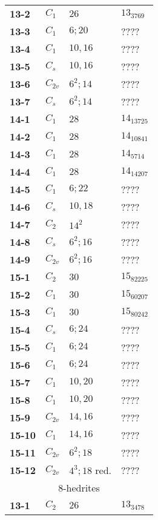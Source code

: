 \documentclass[12pt]{article}
\begin{document}
\begin{table}
\begin{center}
{\begin{minipage}{7cm}
\begin{tabular}{||l|l|l|l||}
{\bf 13-2}      &$C_1$  &$26$           &$13_{3769}$\\
{\bf 13-3}      &$C_1$  &$6; 20$                &????\\
{\bf 13-4}      &$C_1$  &$10, 16$               &????\\
{\bf 13-5}      &$C_s$  &$10, 16$               &????\\
{\bf 13-6}      &$C_{2v}$       &$6^2; 14$      &????\\
{\bf 13-7}      &$C_{s}$        &$6^2; 14$      &????\\\hline
{\bf 14-1}      &$C_1$  &$28$           &$14_{13725}$\\
{\bf 14-2}      &$C_1$  &$28$           &$14_{10841}$\\
{\bf 14-3}      &$C_1$  &$28$           &$14_{5714}$\\
{\bf 14-4}      &$C_1$  &$28$           &$14_{14207}$\\
{\bf 14-5}      &$C_1$  &$6; 22$                &????\\
{\bf 14-6}      &$C_s$  &$10, 18$               &????\\
{\bf 14-7}      &$C_2$  &$14^2$         &????\\
{\bf 14-8}      &$C_s$  &$6^2; 16$      &????\\
{\bf 14-9}      &$C_{2v}$       &$6^2; 16$      &????\\\hline
{\bf 15-1}      &$C_2$  &$30$   &$15_{82225}$\\
{\bf 15-2}      &$C_1$  &$30$   &$15_{60207}$\\
{\bf 15-3}      &$C_1$  &$30$   &$15_{80242}$\\
{\bf 15-4}      &$C_s$  &$6;24$ &????\\
{\bf 15-5}      &$C_1$  &$6;24$ &????\\
{\bf 15-6}      &$C_1$  &$6;24$ &????\\
{\bf 15-7}      &$C_1$  &$10,20$        &????\\
{\bf 15-8}      &$C_1$  &$10,20$        &????\\
{\bf 15-9}      &$C_{2v}$  &$14,16$ &????\\
{\bf 15-10}     &$C_1$  &$14,16$        &????\\
{\bf 15-11}     &$C_{2v}$       &$6^2; 18$      &????\\
{\bf 15-12}     &$C_{2v}$       &$4^3; 18$ red. &????\\\hline
\hline
\multicolumn{4}{||c||}{$8$-hedrites}\\\hline
{\bf 13-1}      &$C_2$  &$26$           &$13_{3478}$\\

\end{tabular}
\end{minipage}}
\end{center}
\end{table}
\end{document}
